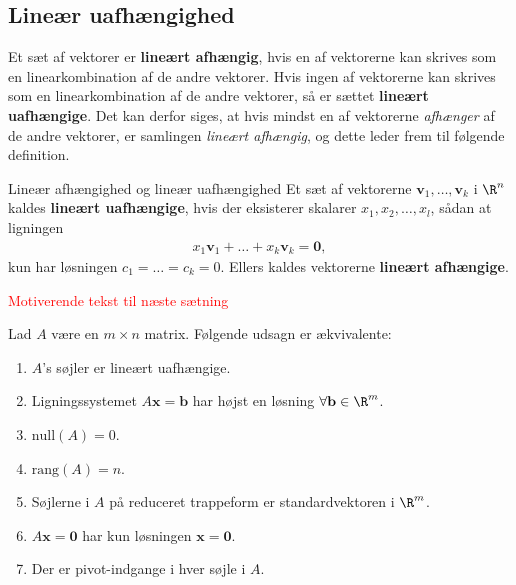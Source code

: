 \subsection{Lineær uafhængighed}
Et sæt af vektorer er \textbf{lineært afhængig}, hvis en af vektorerne kan skrives som en linearkombination af de andre vektorer. Hvis ingen af vektorerne kan skrives som en linearkombination af de andre vektorer, så er sættet \textbf{lineært uafhængige}. Det kan derfor siges, at hvis mindst en af vektorerne \textit{afhænger} af de andre vektorer, er samlingen \textit{lineært afhængig}, og dette leder frem til følgende definition. 
% 
\begin{defn}{Lineær afhængighed og lineær uafhængighed}{}
Et sæt af vektorerne $\mathbf{v}_1, \ldots , \mathbf{v}_k$ i $\R^n$ kaldes \textbf{lineært uafhængige}, hvis der eksisterer skalarer $x_1,x_2, \ldots , x_l$, sådan at ligningen 
\begin{align*}
x_1\mathbf{v}_1 + \ldots + x_k \mathbf{v}_k = \mathbf{0}, 
\end{align*}
kun har løsningen $c_1 = \ldots = c_k = 0$.
Ellers kaldes vektorerne \textbf{lineært afhængige}.
\end{defn}
%
\begin{eks}

\end{eks}
% 
\textcolor{red}{Motiverende tekst til næste sætning}
%
\begin{thm}{}{}
%
Lad $A$ være en $m \times n$ matrix.
Følgende udsagn er ækvivalente:
%
\begin{enumerate}[label=(\alph*)]
\item $A$'s søjler er lineært uafhængige. 
\item Ligningssystemet $A\mathbf{x}=\mathbf{b}$ har højst en løsning $\forall \mathbf{b} \in \R^m$.
\item $\text{null}(A)=0$.
\item $\text{rang}(A)=n$.
\item Søjlerne i $A$ på reduceret trappeform er standardvektoren i $\R^m$.
\item $A\mathbf{x}=\mathbf{0}$ har kun løsningen $\mathbf{x}=\mathbf{0}$.                                                                                                                                                                                                                                                                                                                         
\item Der er pivot-indgange i hver søjle i $A$. 
\end{enumerate}
%
\end{thm}
